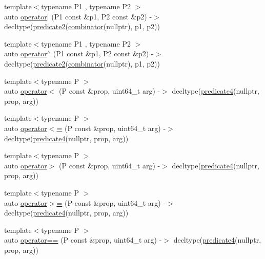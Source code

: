 \begin{DoxyCompactItemize}
\item 
{\footnotesize template$<$typename P1 , typename P2 $>$ }\\auto \hyperlink{namespacepfq__lang_adeec773d44aae2b2f2957e1498c4ce8f}{operator$\vert$} (P1 const \&p1, P2 const \&p2) -\/$>$ decltype(\hyperlink{namespacepfq__lang_a89ea436faf8b7f13512e07efbce83b41}{predicate2}(\hyperlink{namespacepfq__lang_a35f3de0a6684c64d0465aa3f263fa8a6}{combinator}(nullptr), p1, p2))
\item 
{\footnotesize template$<$typename P1 , typename P2 $>$ }\\auto \hyperlink{namespacepfq__lang_a29166c6bb957d6edd6892b7081f574df}{operator$^\wedge$} (P1 const \&p1, P2 const \&p2) -\/$>$ decltype(\hyperlink{namespacepfq__lang_a89ea436faf8b7f13512e07efbce83b41}{predicate2}(\hyperlink{namespacepfq__lang_a35f3de0a6684c64d0465aa3f263fa8a6}{combinator}(nullptr), p1, p2))
\item 
{\footnotesize template$<$typename P $>$ }\\auto \hyperlink{namespacepfq__lang_a222bd443a88e69ec2b3acd886bb80e37}{operator$<$} (P const \&prop, uint64\-\_\-t arg) -\/$>$ decltype(\hyperlink{namespacepfq__lang_a1a9064340f4197e3dd4109a849a224dc}{predicate4}(nullptr, prop, arg))
\item 
{\footnotesize template$<$typename P $>$ }\\auto \hyperlink{namespacepfq__lang_a67b8e80010c51a199869c1c2368b87be}{operator$<$=} (P const \&prop, uint64\-\_\-t arg) -\/$>$ decltype(\hyperlink{namespacepfq__lang_a1a9064340f4197e3dd4109a849a224dc}{predicate4}(nullptr, prop, arg))
\item 
{\footnotesize template$<$typename P $>$ }\\auto \hyperlink{namespacepfq__lang_ab210ad49979608b563eaa74a0d42b63a}{operator$>$} (P const \&prop, uint64\-\_\-t arg) -\/$>$ decltype(\hyperlink{namespacepfq__lang_a1a9064340f4197e3dd4109a849a224dc}{predicate4}(nullptr, prop, arg))
\item 
{\footnotesize template$<$typename P $>$ }\\auto \hyperlink{namespacepfq__lang_ac37c4aac9486ceca12814ccd9b4c3306}{operator$>$=} (P const \&prop, uint64\-\_\-t arg) -\/$>$ decltype(\hyperlink{namespacepfq__lang_a1a9064340f4197e3dd4109a849a224dc}{predicate4}(nullptr, prop, arg))
\item 
{\footnotesize template$<$typename P $>$ }\\auto \hyperlink{namespacepfq__lang_ac55d12423490f127fcb57b29535ca791}{operator==} (P const \&prop, uint64\-\_\-t arg) -\/$>$ decltype(\hyperlink{namespacepfq__lang_a1a9064340f4197e3dd4109a849a224dc}{predicate4}(nullptr, prop, arg))

\end{DoxyCompactItemize}
